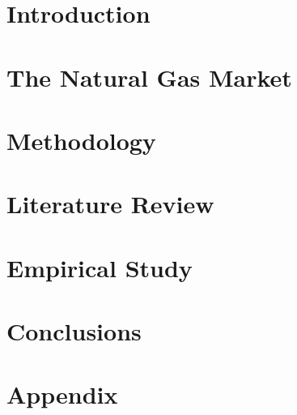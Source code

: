 
\part{Introduction}

%
\part{The Natural Gas Market}


\part{Methodology}


\part{Literature Review}


\part{Empirical Study}




\part{Conclusions}





\part{Appendix}
\newpage


\newpage



